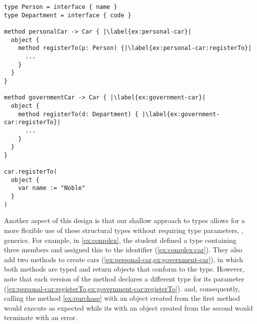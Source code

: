 \begin{lstlisting}[caption={A program in development with a well-typed execution.},escapechar=|,label={ex:complex},float,floatplacement=htb]
type Person = interface { name }
type Department = interface { code }

method personalCar -> Car { |\label{ex:personal-car}|
  object {
    method registerTo(p: Person) {|\label{ex:personal-car:registerTo}|
      ...
    } 
  }
}

method governmentCar -> Car { |\label{ex:government-car}|
  object {
    method registerTo(d: Department) { |\label{ex:government-car:registerTo}|
      ...
    }
  }
}

car.registerTo(
  object {
    var name := "Noble"
  }
)
\end{lstlisting}

Another aspect of this design is
that our shallow approach to types
allows for a more flexible use of these structural types
without requiring type parameters, \ie, generics.
For example, in \cref{ex:complex}, the student defined a type containing
three members and assigned this to the identifier  (\cref{ex:complex:car}).
They also add two methods to create cars 
(\cref{ex:personal-car,ex:government-car}),
in which both methods are typed and return objects that conform to
the  type.
However, note that each version of the  method
declares a different type for its parameter
(\cref{ex:personal-car:registerTo,ex:government-car:registerTo}).
and, consequently, calling the 
 method \cref{ex:purchase} with
an object created from the first method would execute as expected
while its with an object created from the second would terminate with
an error. 




